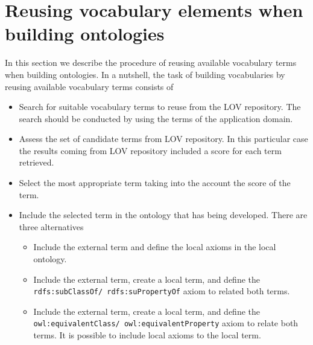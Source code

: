 
 
\section{Reusing vocabulary elements when building ontologies}\label{sec:reuse}
In this section we describe the procedure of reusing available vocabulary terms when building ontologies. In a nutshell, the task of building vocabularies by reusing available vocabulary terms consists of
\begin{itemize}
	\item Search for suitable vocabulary terms to reuse from the LOV repository. The search should be conducted by using the terms of the application domain.
	\item Assess the set of candidate terms from LOV repository. In this particular case the results coming from LOV repository included a score for each term retrieved.
	\item Select the most appropriate term taking into the account the score of the term.
	\item Include the selected term in the ontology that has being developed. There are three alternatives 
	\begin{itemize}
		\item Include the external term and define the local axioms in the local ontology.
		\item Include the external term, create a local term, and define the {\tt rdfs:subClassOf/ rdfs:suPropertyOf} axiom to related both terms.
		\item Include the external term, create a local term, and define the {\tt owl:equivalentClass/ owl:equivalentProperty} axiom to relate both terms. It is possible to include local axioms to the local term.				
	\end{itemize}
\end{itemize}

